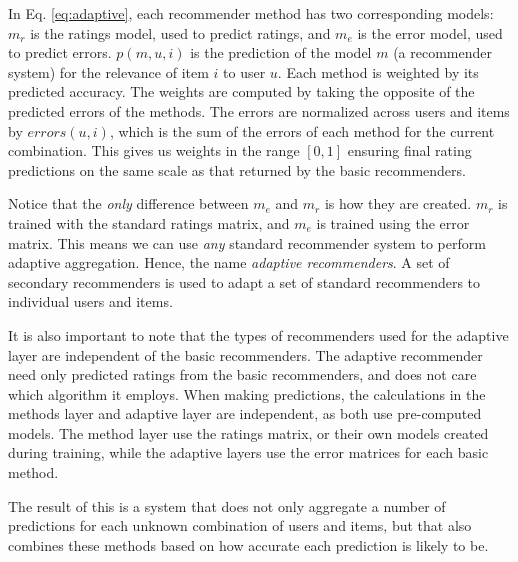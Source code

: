 In Eq. \ref{eq:adaptive}, each recommender method has two corresponding models:
$m_r$ is the ratings model, used to predict ratings, and
$m_e$ is the error model, used to predict errors.
$p(m,u,i)$ is the prediction of the model $m$ (a recommender system)
for the relevance of item $i$ to user $u$.
Each method is weighted by its predicted accuracy.
The weights are computed by taking the opposite
of the predicted errors of the methods.
The errors are normalized across users and items by $errors(u,i)$,
which is the sum of the errors of each method for the current combination.
This gives us weights in the range $[0,1]$ ensuring
final rating predictions on the same scale as that returned by the basic recommenders.

Notice that the \emph{only} difference between $m_e$ and $m_r$ is how they are created.
$m_r$ is trained with the standard ratings matrix, and $m_e$ is trained using the error matrix.
This means we can use \emph{any} standard recommender system to perform adaptive aggregation.
Hence, the name \emph{adaptive recommenders}.
A set of secondary recommenders is used to adapt a set of standard
recommenders to individual users and items.

It is also important to note that the types of recommenders used for the adaptive layer
are independent of the basic recommenders.
The adaptive recommender need only predicted ratings from the basic recommenders,
and does not care which algorithm it employs.
When making predictions, the calculations in the methods layer and adaptive layer
are independent, as both use pre-computed models.
The method layer use the ratings matrix, or their own models
created during training, while the adaptive layers use the error matrices for each
basic method.

The result of this is a system that does not only aggregate a number of predictions for each unknown
combination of users and items,
but that also combines these methods based on how accurate each prediction is likely to be.


